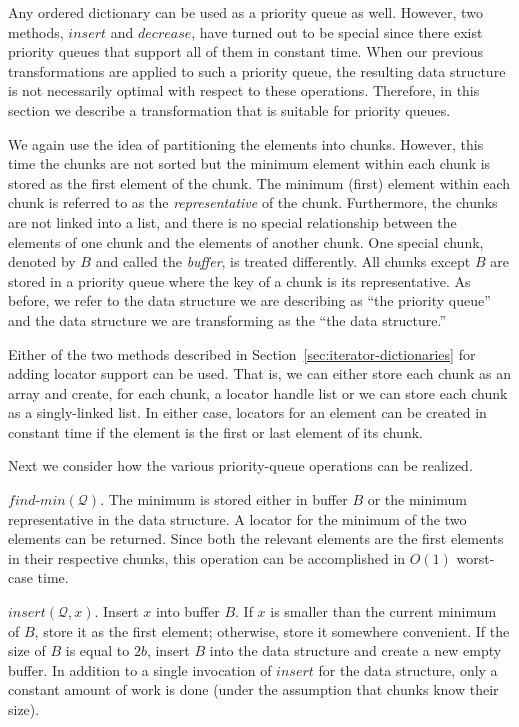 \documentclass{DIKU-article}
\newcommand{\secref}[1]{\mbox{Section~\ref{sec:#1}}}
\newcommand{\Findmin}{\mbox{$\mathit{find}$}\textnormal{-}\allowbreak{}\mbox{$\mathit{min}$}}
\newcommand{\Insert}{\mbox{$\mathit{insert}$}}
\newcommand{\Decrease}{\mbox{$\mathit{decrease}$}}
\begin{document}
Any ordered dictionary can be used as a priority queue as well.
However, two methods, \Insert{} and \Decrease{}, have turned out to be
special since there exist priority queues that support all of them in
constant time.  When our previous transformations are applied to such
a priority queue, the resulting data structure is not necessarily
optimal with respect to these operations. Therefore, in this section
we describe a transformation that is suitable for priority queues.

We again use the idea of partitioning the elements into chunks.
However, this time the chunks are not sorted but the minimum element
within each chunk is stored as the first element of the chunk.  The
minimum (first) element within each chunk is referred to as the
\emph{representative} of the chunk.  Furthermore, the chunks are not
linked into a list, and there is no special relationship between the
elements of one chunk and the elements of another chunk. One special
chunk, denoted by $B$ and called the \emph{buffer}, is treated
differently.  All chunks except $B$ are stored in a priority queue
where the key of a chunk is its representative.  As before, we refer
to the data structure we are describing as ``the priority queue'' and
the data structure we are transforming as the ``the data structure.''

Either of the two methods described in \secref{iterator-dictionaries}
for adding locator support can be used.  That is, we can either store
each chunk as an array and create, for each chunk, a locator handle
list or we can store each chunk as a singly-linked list. In either
case, locators for an element can be created in constant time if the
element is the first or last element of its chunk. 

Next we consider how the various priority-queue operations can be
realized.

\Findmin{}$(\mathcal{Q})$. The minimum is stored either in buffer $B$
or the minimum representative in the data structure. A locator for
the minimum of the two elements can be returned. Since both the
relevant elements are the first elements in their respective chunks,
this operation can be accomplished in $O(1)$ worst-case time.

\Insert{}$(\mathcal{Q}, x)$. Insert $x$ into buffer $B$. If $x$ is
smaller than the current minimum of $B$, store it as the first
element; otherwise, store it somewhere convenient. If the size of $B$
is equal to $2b$, insert $B$ into the data structure and create a new
empty buffer.  In addition to a single invocation of \Insert{} for the
data structure, only a constant amount of work is done (under the
assumption that chunks know their size).
\end{document}
